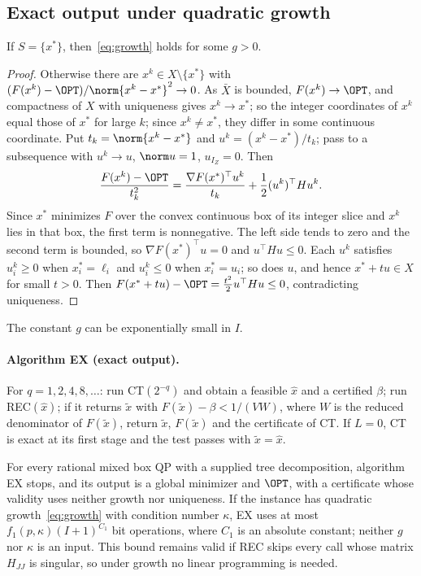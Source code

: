 \subsection{Exact output under quadratic growth}

\begin{lemma}\label{lem:unique-growth}
If $S=\{x^*\}$, then~\eqref{eq:growth} holds for some $g>0$.
\end{lemma}

\begin{proof}
Otherwise there are $x^k\in X\setminus\{x^*\}$ with
$(F(x^k)-\OPT)/\norm{x^k-x^*}^2\to0$. As $\bar X$ is bounded,
$F(x^k)\to\OPT$, and compactness of $X$ with uniqueness gives $x^k\to x^*$;
so the integer coordinates of $x^k$ equal those of $x^*$ for large $k$;
since $x^k\ne x^*$, they differ in some continuous coordinate. Put
$t_k=\norm{x^k-x^*}$ and
$u^k=(x^k-x^*)/t_k$; pass to a subsequence with $u^k\to u$, $\norm u=1$,
$u_{I_Z}=0$. Then
\[
\frac{F(x^k)-\OPT}{t_k^2}=\frac{\nabla F(x^*)^{\top}u^k}{t_k}
+\frac12(u^k)^{\top}Hu^k .
\]
Since $x^*$ minimizes $F$ over the convex continuous box of its integer slice
and $x^k$ lies in that box, the first term is nonnegative. The left side
tends to zero and the second term is bounded, so
$\nabla F(x^*)^{\top}u=0$ and $u^{\top}Hu\le0$. Each $u^k$ satisfies
$u^k_i\ge0$ when $x^*_i=\ell_i$ and $u^k_i\le0$ when $x^*_i=u_i$; so does
$u$, and hence $x^*+tu\in X$ for small $t>0$. Then
$F(x^*+tu)-\OPT=\frac{t^2}2u^{\top}Hu\le0$, contradicting uniqueness.
\end{proof}

The constant $g$ can be exponentially small in $I$.

\paragraph{Algorithm EX (exact output).}
For $q=1,2,4,8,\dots$: run CT$(2^{-q})$ and obtain a feasible $\hat x$ and a
certified $\beta$; run REC$(\hat x)$; if it returns $\tilde x$ with
$F(\tilde x)-\beta<1/(VW)$, where $W$ is the reduced denominator of
$F(\tilde x)$, return $\tilde x$, $F(\tilde x)$ and the certificate of
CT. If $L=0$, CT is exact at its first stage and the test passes with
$\tilde x=\hat x$.

\begin{theorem}\label{thm:exact}
For every rational mixed box QP with a supplied tree decomposition, algorithm
EX stops, and its output is a global minimizer and $\OPT$, with a certificate
whose validity uses neither growth nor uniqueness. If the instance has
quadratic growth~\eqref{eq:growth} with condition number $\kappa$, EX uses
at most $f_1(p,\kappa)(I+1)^{C_1}$ bit operations, where $C_1$ is an absolute
constant; neither $g$ nor $\kappa$ is an input. This bound remains valid if
REC skips
every call whose matrix $H_{JJ}$ is singular, so under growth no linear
programming is needed.
\end{theorem}

